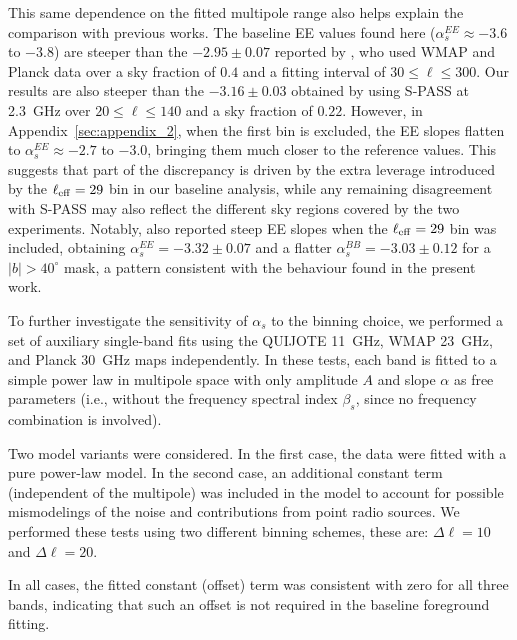 This same dependence on the fitted multipole range also helps explain the comparison with previous works. The baseline EE values found here ($\alpha_s^{EE} \approx -3.6$ to $-3.8$) are steeper than the $-2.95 \pm 0.07$ reported by \citet{Martire_2022}, who used WMAP and Planck data over a sky fraction of $0.4$ and a fitting interval of $30 \leq \ell \leq 300$. Our results are also steeper than the $-3.16 \pm 0.03$ obtained by \citet{Krachmalnicoff_2018} using S-PASS at 2.3~GHz over $20 \leq \ell \leq 140$ and a sky fraction of $0.22$. However, in Appendix~\ref{sec:appendix_2}, when the first bin is excluded, the EE slopes flatten to $\alpha_s^{EE} \approx -2.7$ to $-3.0$, bringing them much closer to the reference values. This suggests that part of the discrepancy is driven by the extra leverage introduced by the $\ell_{\rm eff} = 29$ bin in our baseline analysis, while any remaining disagreement with S-PASS may also reflect the different sky regions covered by the two experiments. Notably, \citet{Krachmalnicoff_2018} also reported steep EE slopes when the $\ell_{\rm eff} = 29$ bin was included, obtaining $\alpha_s^{EE} = -3.32 \pm 0.07$ and a flatter $\alpha_s^{BB} = -3.03 \pm 0.12$ for a $|b| > 40^{\circ}$ mask, a pattern consistent with the behaviour found in the present work.


To further investigate the sensitivity of $\alpha_s$ to the binning choice, we performed a set of auxiliary single-band fits using the QUIJOTE 11~GHz, WMAP 23~GHz, and Planck 30~GHz maps independently. In these tests, each band is fitted to a simple power law in multipole space with only amplitude $A$ and slope $\alpha$ as free parameters (i.e., without the frequency spectral index $\beta_s$, since no frequency combination is involved).

Two model variants were considered. In the first case, the data were fitted with a pure power-law model. In the second case, an additional constant term (independent of the multipole) was included in the model to account for possible mismodelings of the noise and contributions from point radio sources. We performed these tests using two different binning schemes, these are: $\Delta\ell = 10$ and $\Delta\ell = 20$.

In all cases, the fitted constant (offset) term was consistent with zero for all three bands, indicating that such an offset is not required in the baseline foreground fitting.


